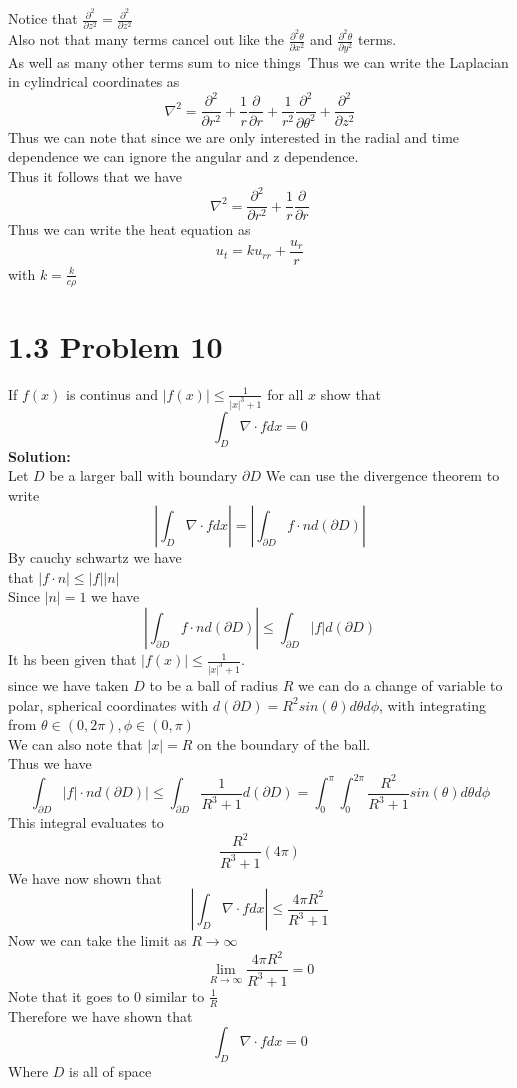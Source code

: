 \documentclass{article}
\begin{document}
Notice that $\frac{\partial^2}{\partial z^2} = \frac{\partial^2}{\partial z^2}$\\
Also not that many terms cancel out like the $\frac{\partial^2 \theta}{\partial x^2}$ and $\frac{\partial^2 \theta}{\partial y^2}$ terms.\\ As well as many other terms sum to nice things\
Thus we can write the Laplacian in cylindrical coordinates as\\
$$\nabla^2 = \frac{\partial^2}{\partial r^2} + \frac{1}{r}\frac{\partial}{\partial r} + \frac{1}{r^2}\frac{\partial^2}{\partial \theta^2} + \frac{\partial^2}{\partial z^2}$$
Thus we can note that since we are only interested in the radial and time dependence we can ignore the angular and z dependence.\\
Thus it follows that we have\\
$$\nabla^2 = \frac{\partial^2}{\partial r^2} + \frac{1}{r}\frac{\partial}{\partial r}$$
Thus we can write the heat equation as\\
$$u_t = k u_{rr} + \frac{u_r}{r}$$
with $k = \frac{k}{c \rho}$\\

\section*{1.3 Problem 10}
If $f(x)$ is continus and $|f(x)| \leq \frac{1}{|x|^3 + 1}$ for all $x$ show that $$\int_{D} \nabla \cdot f dx = 0$$
\textbf{Solution:}\\
Let $D$ be a larger ball with boundary $\partial D$ We can use the divergence theorem to write\\
$$|\int_{D} \nabla \cdot f dx| = |\int_{\partial D} f \cdot n d(\partial D)|$$
By cauchy schwartz we have\\
that $|f \cdot n| \leq |f| |n|$\\
Since $|n| = 1$ we have\\
$$ |\int_{\partial D} f \cdot n d(\partial D)| \leq \int_{\partial D} |f| d(\partial D)$$
It hs been given that $|f(x)| \leq \frac{1}{|x|^3 + 1}$.\\
since we have taken $D$ to be a ball of radius $R$ we can do a change of variable to polar, spherical coordinates with $d(\partial D)  = R^2sin(\theta) d\theta d\phi$, with integrating from $\theta \in (0,2\pi), \phi \in (0, \pi)$\\
We can also note that $|x| = R$ on the boundary of the ball.\\
Thus we have\\
$$\int_{\partial D} |f| \cdot n d(\partial D)| \leq \int_{\partial D} \frac{1}{R^3 + 1} d(\partial D) = \int_{0}^{\pi}\int_{0}^{2\pi} \frac{R^2}{R^3+1} sin(\theta)d\theta d\phi$$
This integral evaluates to\\
$$\frac{R^2}{R^3 + 1} (4 \pi)$$
We have now shown that\\
$$|\int_{D} \nabla \cdot f dx| \leq \frac{4 \pi R^2}{R^3 + 1}$$
Now we can take the limit as $R \to \infty$\\
$$\lim_{R \to \infty} \frac{4 \pi R^2}{R^3 + 1} = 0$$
Note that it goes to 0 similar to $\frac{1}{R}$\\
Therefore we have shown that\\
$$\int_{D} \nabla \cdot f dx = 0$$
Where $D$ is all of space
\end{document}

